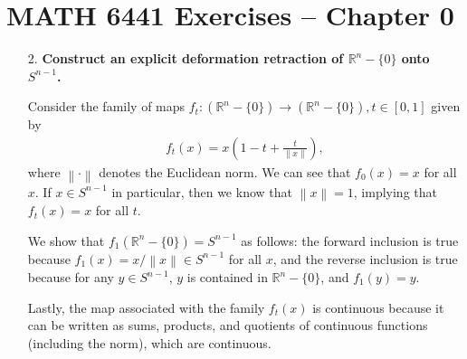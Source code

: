 \documentclass[a4paper,12pt]{article}
\newcommand{\norm}[1]{\left\lVert#1\right\rVert}
\begin{document}
\section*{MATH 6441 Exercises -- Chapter 0}
\begin{enumerate}
    \item[2.]
        \boldmath\textbf{Construct an explicit deformation retraction of $\mathbb{R}^n - \{0\}$ onto $S^{n - 1}$.
        }\unboldmath \par
        Consider the family of maps $f_t : (\mathbb{R}^n - \{0\}) \to (\mathbb{R}^n - \{0\}), t \in [0, 1]$ given by
        \begin{align*}
            f_t(x) = x \left( 1 - t + \frac{t}{\norm{x}} \right),
        \end{align*}
        where $\norm{\cdot}$ denotes the Euclidean norm. We can see that $f_0(x) = x$ for all $x$. If $x \in S^{n - 1}$ in particular, then we know that $\norm{x} = 1$, implying that $f_t(x) = x$ for all $t$. \par
        We show that $f_1(\mathbb{R}^n - \{0\}) = S^{n - 1}$ as follows: the forward inclusion is true because $f_1(x) = x/\norm{x} \in S^{n - 1}$ for all $x$, and the reverse inclusion is true because for any $y \in S^{n - 1}$, $y$ is contained in $\mathbb{R}^n - \{0\}$, and $f_1(y) = y$. \par
        Lastly, the map associated with the family $f_t(x)$ is continuous because it can be written as sums, products, and quotients of continuous functions (including the norm), which are continuous. %


\end{enumerate}
\end{document}
